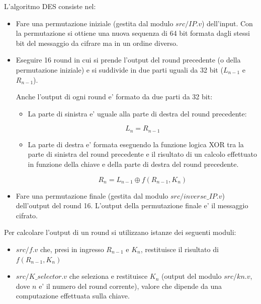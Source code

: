 \documentclass[a4paper]{article}
\begin{document}
L'algoritmo DES consiste nel:
\begin{itemize}
    \item Fare una permutazione iniziale (gestita dal modulo $src/IP.v$) dell'input. Con la permutazione si ottiene una nuova sequenza di 64 bit formata dagli stessi bit del messaggio da cifrare ma in un ordine diverso.
    \item Eseguire 16 round in cui si prende l'output del round precedente (o della permutazione iniziale) e si suddivide in due parti uguali da 32 bit ($L_{n-1}$ e $R_{n-1}$).


          Anche l'output di ogni round e' formato da due parti da 32 bit:
          \begin{itemize}
              \item La parte di sinistra e' uguale alla parte di destra del round precedente: 
                
                    $$L_n = R_{n-1}$$

              \item La parte di destra e' formata eseguendo la funzione logica XOR tra la parte di sinistra del round precedente e il risultato di un calcolo effettuato in funzione della chiave e della parte di destra del round precedente.

                    $$R_n = L_{n-1} \oplus f(R_{n-1}, K_n)$$

          \end{itemize}  
    \item Fare una permutazione finale (gestita dal modulo $src/inverse\_IP.v$) dell'output del round 16. L'output della permutazione finale e' il messaggio cifrato.
\end{itemize}



Per calcolare l'output di un round si utilizzano istanze dei seguenti moduli:
\begin{itemize}
    \item $src/f.v$ che, presi in ingresso $R_{n-1}$ e $K_{n}$, restituisce il risultato di $f(R_{n-1}, K_n)$
    \item $src/K\_selector.v$ che seleziona e restituisce $K_n$ (output del modulo $src/kn.v$, dove $n$ e' il numero del round corrente), valore che dipende da una computazione effettuata sulla chiave.

\end{itemize}
\end{document}
